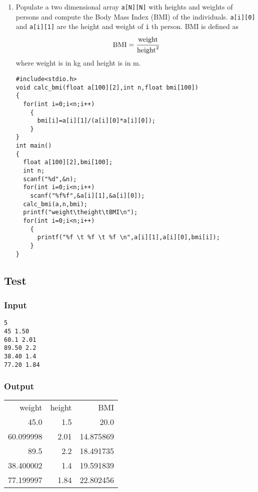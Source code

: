 \documentclass[11pt]{article}
\begin{document}
\begin{enumerate}
\item Populate a two dimensional array \texttt{a[N][N]} with heights
and weights of persons and compute the Body Mass Index
(BMI) of the individuals. \texttt{a[i][0]} and \texttt{a[i][1]} are the
height and weight of \texttt{i} th person.  BMI is defined as
\[
   \text{BMI} = \cfrac{\text{weight}}{\text{height}^2}
   \]
where weight is in kg and height is in m.
\begin{verbatim}
#include<stdio.h>
void calc_bmi(float a[100][2],int n,float bmi[100])
{
  for(int i=0;i<n;i++)
    {
      bmi[i]=a[i][1]/(a[i][0]*a[i][0]);
    }
}
int main()
{
  float a[100][2],bmi[100];
  int n;
  scanf("%d",&n);
  for(int i=0;i<n;i++)
    scanf("%f%f",&a[i][1],&a[i][0]);
  calc_bmi(a,n,bmi);
  printf("weight\theight\tBMI\n");
  for(int i=0;i<n;i++)
    {
      printf("%f \t %f \t %f \n",a[i][1],a[i][0],bmi[i]);
    } 
}
\end{verbatim}
\end{enumerate}
\subsection{Test}
\label{sec-3-4}
\subsubsection{Input}
\label{sec-3-4-1}
\begin{verbatim}
5
45 1.50
60.1 2.01
89.50 2.2
38.40 1.4
77.20 1.84
\end{verbatim}

\subsubsection{Output}
\label{sec-3-4-2}
\begin{center}
\begin{tabular}{rrr}
weight & height & BMI\\
45.0 & 1.5 & 20.0\\
60.099998 & 2.01 & 14.875869\\
89.5 & 2.2 & 18.491735\\
38.400002 & 1.4 & 19.591839\\
77.199997 & 1.84 & 22.802456\\
\end{tabular}
\end{center}
\end{document}
